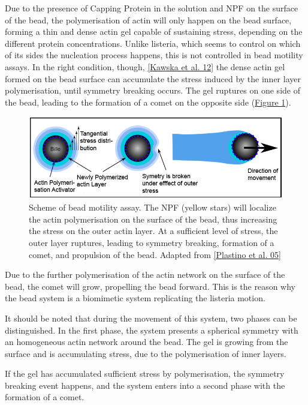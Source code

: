 \documentclass[A4paperpaper,11pt,english]{sphinxmanual}
\begin{document}
Due to the presence of Capping Protein in the solution and NPF on the surface of
the bead, the polymerisation of actin will only happen
on the bead surface, forming a thin and dense actin gel capable of sustaining stress, depending
on the different protein concentrations. Unlike listeria, which
seems to control on which of its sides the nucleation process happens, this is not
controlled in bead motility assays. In the right condition, though,
{\hyperref[index-latex:kawska2012]{{[}Kawska et al. 12{]}}} the dense actin gel formed on the bead surface can
accumulate the stress induced by the inner layer polymerisation, until symmetry
breaking occurs. The gel ruptures on one side of the bead, leading to
the formation of a comet on the opposite side (\hyperref[index-latex:fig-bead-motility]{Figure  \ref*{index-latex:fig-bead-motility}}).
\begin{figure}[htbp]
\centering
\capstart

\includegraphics[width=0.600\linewidth]{Plastino-Sykes-2005.png}
\caption{Scheme of bead motility assay. The NPF (yellow stars) will localize the
actin polymerisation on the surface of the bead, thus increasing the stress on
the outer actin layer. At a sufficient level of stress, the outer layer
ruptures, leading to symmetry breaking, formation of a comet, and
propulsion of the bead. Adapted from {\hyperref[index-latex:plastino2005]{{[}Plastino et al. 05{]}}}}\label{index-latex:fig-bead-motility}\end{figure}

Due to the further polymerisation of the actin network on the surface of the bead,
the comet will grow, propelling the bead forward. This is the reason why the bead
system is a biomimetic system replicating the listeria motion.

It should be noted that during the movement of this system, two phases can be
distinguished. In the first phase, the system presents a spherical symmetry with
an homogeneous actin  network around the bead. The gel is growing from the
surface and is accumulating stress, due to the polymerisation of inner layers.

If the gel has accumulated sufficient stress by polymerisation,  the symmetry breaking event happens, and the system enters into
a second phase with the formation of a comet.
\end{document}
